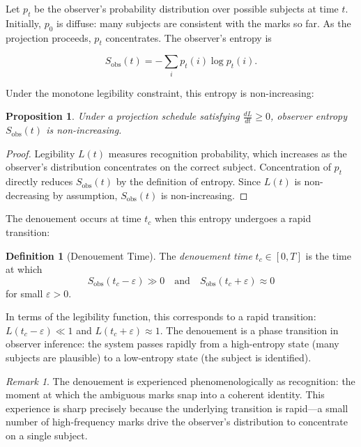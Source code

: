 \documentclass[11pt, twoside]{article}
\theoremstyle{plain}
\newtheorem{proposition}[theorem]{Proposition}
\theoremstyle{definition}
\newtheorem{definition}[theorem]{Definition}
\theoremstyle{remark}
\newtheorem{remark}[theorem]{Remark}
\begin{document}
Let $p_t$ be the observer's probability distribution over possible subjects at time $t$. Initially, $p_0$ is diffuse: many subjects are consistent with the marks so far. As the projection proceeds, $p_t$ concentrates. The observer's entropy is

\[
S_{\text{obs}}(t) = -\sum_i p_t(i) \log p_t(i).
\]

Under the monotone legibility constraint, this entropy is non-increasing:

\begin{proposition}
\label{prop:observer-entropy}
Under a projection schedule satisfying $\frac{dL}{dt} \geq 0$, observer entropy $S_{\text{obs}}(t)$ is non-increasing.
\end{proposition}

\begin{proof}
Legibility $L(t)$ measures recognition probability, which increases as the observer's distribution concentrates on the correct subject. Concentration of $p_t$ directly reduces $S_{\text{obs}}(t)$ by the definition of entropy. Since $L(t)$ is non-decreasing by assumption, $S_{\text{obs}}(t)$ is non-increasing.
\end{proof}

The denouement occurs at time $t_c$ when this entropy undergoes a rapid transition:

\begin{definition}[Denouement Time]
The \emph{denouement time} $t_c \in [0, T]$ is the time at which
\[
S_{\text{obs}}(t_c - \varepsilon) \gg 0 \quad \text{and} \quad S_{\text{obs}}(t_c + \varepsilon) \approx 0
\]
for small $\varepsilon > 0$.
\end{definition}

In terms of the legibility function, this corresponds to a rapid transition: $L(t_c - \varepsilon) \ll 1$ and $L(t_c + \varepsilon) \approx 1$. The denouement is a phase transition in observer inference: the system passes rapidly from a high-entropy state (many subjects are plausible) to a low-entropy state (the subject is identified).

\begin{remark}
The denouement is experienced phenomenologically as recognition: the moment at which the ambiguous marks snap into a coherent identity. This experience is sharp precisely because the underlying transition is rapid---a small number of high-frequency marks drive the observer's distribution to concentrate on a single subject.
\end{remark}
\end{document}
